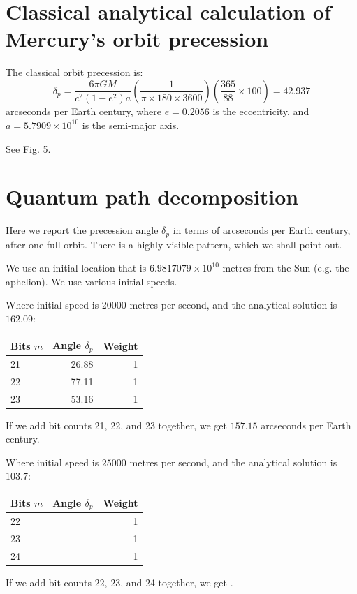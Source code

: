 \documentclass[12pt]{article}
\begin{document}
\section{Classical analytical calculation of Mercury's orbit precession}

The classical orbit precession is:
\begin{equation}
\label{delta_p}
\delta_{p} = \frac{6 \pi G M}{c^2 (1 - e^2) a} \left( \frac{1}{ \pi \times 180 \times 3600} \right) \left( \frac{365}{88} \times 100 \right) = 42.937
\end{equation}
arcseconds per Earth century, where $e = 0.2056$ is the eccentricity, and $a = 5.7909 \times 10^{10}$ is the semi-major axis.

See Fig. 5.


\section{Quantum path decomposition}

Here we report the precession angle $\delta_{p}$ in terms of arcseconds per Earth century, after one full orbit.
There is a highly visible pattern, which we shall point out.

We use an initial location that is $6.9817079 \times 10^{10}$ metres from the Sun (e.g. the aphelion).
We use various initial speeds.

Where initial speed is $20000$ metres per second, and the analytical solution is $162.09$:
\begin{center}
\begin{tabular}{| l | r | r |}
  \hline
Bits $m$ & Angle $\delta_{p}$ & Weight\\
\hline
\hline
21 & 26.88 & 1 \\
22 & 77.11 & 1\\
23 & 53.16 & 1 \\
  \hline  
\end{tabular}
\end{center}
If we add bit counts 21, 22, and 23 together, we get $157.15$ arcseconds per Earth century.

Where initial speed is $25000$ metres per second, and the analytical solution is $103.7$:
\begin{center}
\begin{tabular}{| l | r | r |}
  \hline
Bits $m$ & Angle $\delta_{p}$ & Weight\\
\hline
\hline
22 &  & 1\\
23 &  & 1\\
24 &  & 1\\
  \hline  
\end{tabular}
\end{center}
If we add bit counts 22, 23, and 24 together, we get $ $.
\end{document}
